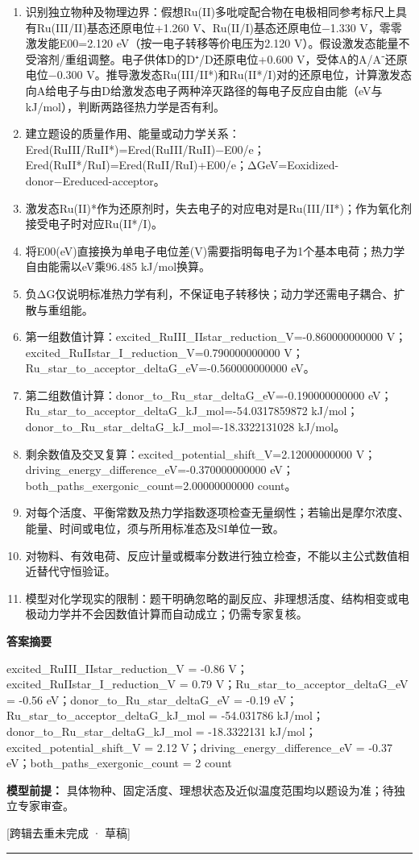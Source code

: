 \documentclass[UTF8,11pt,a4paper]{ctexart}
\begin{document}
\begin{enumerate}
\item 识别独立物种及物理边界：假想Ru(II)多吡啶配合物在电极相同参考标尺上具有Ru(III/II)基态还原电位+1.260 V、Ru(II/I)基态还原电位−1.330 V，零零激发能E00=2.120 eV（按一电子转移等价电压为2.120 V）。假设激发态能量不受溶剂/重组调整。电子供体D的D⁺/D还原电位+0.600 V，受体A的A/A⁻还原电位−0.300 V。推导激发态Ru(III/II*)和Ru(II*/I)对的还原电位，计算激发态向A给电子与由D给激发态电子两种淬灭路径的每电子反应自由能（eV与kJ/mol），判断两路径热力学是否有利。
\item 建立题设的质量作用、能量或动力学关系：Ered(RuIII/RuII*)=Ered(RuIII/RuII)−E00/e；Ered(RuII*/RuI)=Ered(RuII/RuI)+E00/e；ΔGeV=Eoxidized-donor−Ereduced-acceptor。
\item 激发态Ru(II)*作为还原剂时，失去电子的对应电对是Ru(III/II*)；作为氧化剂接受电子时对应Ru(II*/I)。
\item 将E00(eV)直接换为单电子电位差(V)需要指明每电子为1个基本电荷；热力学自由能需以eV乘96.485 kJ/mol换算。
\item 负ΔG仅说明标准热力学有利，不保证电子转移快；动力学还需电子耦合、扩散与重组能。
\item 第一组数值计算：excited\_RuIII\_IIstar\_reduction\_V=-0.860000000000 V；excited\_RuIIstar\_I\_reduction\_V=0.790000000000 V；Ru\_star\_to\_acceptor\_deltaG\_eV=-0.560000000000 eV。
\item 第二组数值计算：donor\_to\_Ru\_star\_deltaG\_eV=-0.190000000000 eV；Ru\_star\_to\_acceptor\_deltaG\_kJ\_mol=-54.0317859872 kJ/mol；donor\_to\_Ru\_star\_deltaG\_kJ\_mol=-18.3322131028 kJ/mol。
\item 剩余数值及交叉复算：excited\_potential\_shift\_V=2.12000000000 V；driving\_energy\_difference\_eV=-0.370000000000 eV；both\_paths\_exergonic\_count=2.00000000000 count。
\item 对每个活度、平衡常数及热力学指数逐项检查无量纲性；若输出是摩尔浓度、能量、时间或电位，须与所用标准态及SI单位一致。
\item 对物料、有效电荷、反应计量或概率分数进行独立检查，不能以主公式数值相近替代守恒验证。
\item 模型对化学现实的限制：题干明确忽略的副反应、非理想活度、结构相变或电极动力学并不会因数值计算而自动成立；仍需专家复核。
\end{enumerate}
\noindent\textbf{答案摘要}\par
excited\_RuIII\_IIstar\_reduction\_V = -0.86 V；excited\_RuIIstar\_I\_reduction\_V = 0.79 V；Ru\_star\_to\_acceptor\_deltaG\_eV = -0.56 eV；donor\_to\_Ru\_star\_deltaG\_eV = -0.19 eV；Ru\_star\_to\_acceptor\_deltaG\_kJ\_mol = -54.031786 kJ/mol；donor\_to\_Ru\_star\_deltaG\_kJ\_mol = -18.3322131 kJ/mol；excited\_potential\_shift\_V = 2.12 V；driving\_energy\_difference\_eV = -0.37 eV；both\_paths\_exergonic\_count = 2 count\par
\noindent\textbf{模型前提：}
具体物种、固定活度、理想状态及近似温度范围均以题设为准；待独立专家审查。\par
\noindent\textcolor{red!65!black}{[跨辑去重未完成 · 草稿]} \par
\medskip\hrule\medskip
{}
\end{document}
